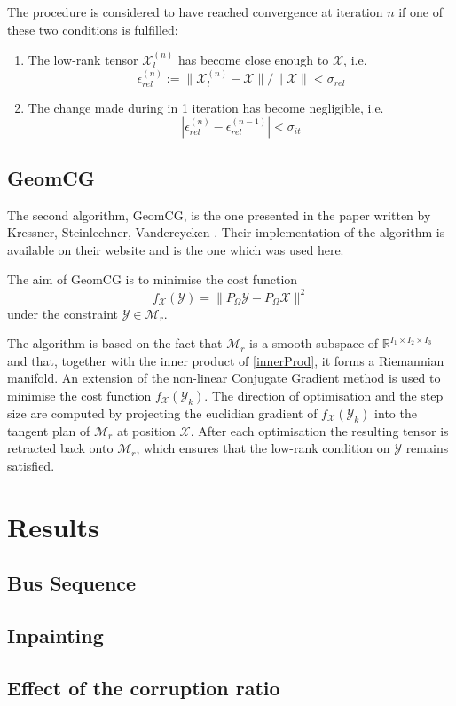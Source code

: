 \documentclass[a4paper, 11pt]{article} %
\def \be {\begin{equation*}}
\def \ee {\end{equation*}}
\def \X {\mathcal{X}}
\def \R {\mathbb{R}}
\def \t {\times}
\def \Y {\mathcal{Y}}
\def \Mr {\mathcal{M}_{r}}
\def \Xl {\mathcal{X}_{l}}
\begin{document}
The procedure is considered to have reached convergence at iteration $n$ if one of these two conditions is fulfilled:
\begin{enumerate}
\item The low-rank tensor $\Xl^{(n)}$ has become close enough to $\X$, i.e.
\be
 \epsilon_{rel}^{(n)}:=\|\Xl^{(n)}-\X \|/\| \X\|<\sigma_{rel}
\ee
\item The change made during in 1 iteration has become negligible, i.e. 
\be
|\epsilon_{rel}^{(n)}-\epsilon_{rel}^{(n-1)}|<\sigma_{it}
\ee
\end{enumerate}

\subsection{GeomCG}
The second algorithm, GeomCG, is the one presented in the paper written by Kressner, Steinlechner, Vandereycken \cite{GeomCG}. Their implementation of the algorithm is available on their website \cite{SiteANCHP} and is the one which was used here.

The aim of GeomCG is to minimise the cost function
\be
f_{\X}(\Y)=\| P_{\Omega}\Y-P_{\Omega}\X\|^2
\ee
under the constraint $\Y \in \Mr$.

The algorithm is based on the fact that $\Mr$  is a smooth subspace of $\R^{I_1\t I_2 \t I_3}$ and that, together with the inner product of \autoref{innerProd}, it forms a Riemannian manifold.
An extension of the non-linear Conjugate Gradient method is used to minimise the cost function $f_{\X}(\Y_k)$. The direction of optimisation and the step size are computed by projecting the euclidian gradient of $f_{\X}(\Y_k)$ into the tangent plan of $\Mr$ at position $\X$. After each optimisation the resulting tensor is retracted back onto $\Mr$, which ensures that the low-rank condition on $\Y$ remains satisfied.
\section{Results}

\subsection{Bus Sequence}
\subsection{Inpainting}
\subsection{Effect of the corruption ratio}
\end{document}
